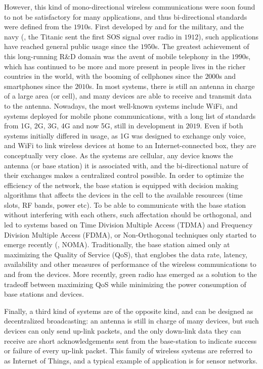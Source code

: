 However, this kind of mono-directional wireless communications were soon found to not be satisfactory for many applications, and thus bi-directional standards were defined from the $1910$s.
First developed by and for the military, and the navy (\eg, the Titanic sent the first SOS signal over radio in $1912$),
such applications have reached general public usage since the $1950$s.
The greatest achievement of this long-running R\&D domain was the avent of mobile telephony in the $1990$s, which has continued to be more and more present in people lives in the richer countries in the world, with the booming of cellphones since the $2000$s and smartphones since the $2010$s.
In most systems, there is still an antenna in charge of a large area (or cell), and many devices are able to receive and transmit data to the antenna.
Nowadays, the most well-known systems include WiFi, and systems deployed for mobile phone communications, with a long list of standards from 1G, 2G, 3G, 4G and now 5G, still in development in $2019$.
Even if both systems initially differed in usage, as 1G was designed to exchange only voice, and WiFi to link wireless devices at home to an Internet-connected box, they are conceptually very close.
As the systems are cellular, any device knows the antenna (or base station) it is associated with, and the bi-directional nature of their exchanges makes a centralized control possible.
In order to optimize the efficiency of the network, the base station is equipped with decision making algorithms that affects the devices in the cell to the available resources (time slots, RF bands, power etc).
To be able to communicate with the base station without interfering with each others, such affectation should be orthogonal, and led to systems based on Time Division Multiple Access (TDMA) and Frequency Division Multiple Access (FDMA), or Non-Orthogonal techniques only started to emerge recently (\eg, NOMA).
Traditionally, the base station aimed only at maximizing the Quality of Service (QoS), that englobes the data rate, latency, availability and other measures of performance of the wireless communications to and from the devices.
More recently, green radio has emerged as a solution to the tradeoff between maximizing QoS while minimizing the power consumption of base stations and devices.


Finally, a third kind of systems are of the opposite kind, and can be designed as decentralized broadcasting: an antenna is still in charge of many devices, but such devices can only send up-link packets, and the only down-link data they can receive are short acknowledgements sent from the base-station to indicate success or failure of every up-link packet.
This family of wireless systems are referred to as Internet of Things,
and a typical example of application is for sensor networks.

